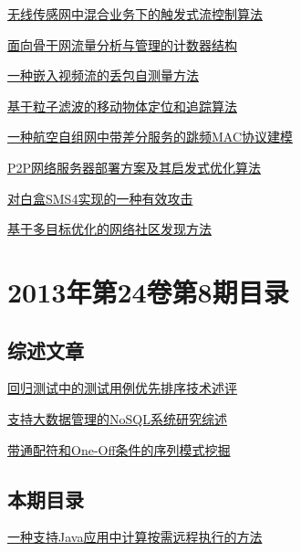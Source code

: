 \documentclass[a4paper]{article}
\begin{document}
\href{http://www.jos.org.cn/ch/reader/download_pdf.aspx?file_no=4351&year_id=2013&quarter_id=9&falg=1}{无线传感网中混合业务下的触发式流控制算法}

\href{http://www.jos.org.cn/ch/reader/download_pdf.aspx?file_no=4365&year_id=2013&quarter_id=9&falg=1}{面向骨干网流量分析与管理的计数器结构}

\href{http://www.jos.org.cn/ch/reader/download_pdf.aspx?file_no=4338&year_id=2013&quarter_id=9&falg=1}{一种嵌入视频流的丢包自测量方法}

\href{http://www.jos.org.cn/ch/reader/download_pdf.aspx?file_no=4367&year_id=2013&quarter_id=9&falg=1}{基于粒子滤波的移动物体定位和追踪算法}

\href{http://www.jos.org.cn/ch/reader/download_pdf.aspx?file_no=4335&year_id=2013&quarter_id=9&falg=1}{一种航空自组网中带差分服务的跳频MAC协议建模}

\href{http://www.jos.org.cn/ch/reader/download_pdf.aspx?file_no=4362&year_id=2013&quarter_id=9&falg=1}{P2P网络服务器部署方案及其启发式优化算法}

\href{http://www.jos.org.cn/ch/reader/download_pdf.aspx?file_no=4356&year_id=2013&quarter_id=9&falg=1}{对白盒SMS4实现的一种有效攻击}

\href{http://www.jos.org.cn/ch/reader/download_pdf.aspx?file_no=4400&year_id=2013&quarter_id=9&falg=1}{基于多目标优化的网络社区发现方法}


\section{\textbf{2013年第24卷第8期目录}}
\subsection{综述文章}
\href{http://www.jos.org.cn/ch/reader/download_pdf.aspx?file_no=4420&year_id=2013&quarter_id=8&falg=1}{回归测试中的测试用例优先排序技术述评}

\href{http://www.jos.org.cn/ch/reader/download_pdf.aspx?file_no=4416&year_id=2013&quarter_id=8&falg=1}{支持大数据管理的NoSQL系统研究综述}

\href{http://www.jos.org.cn/ch/reader/download_pdf.aspx?file_no=4422&year_id=2013&quarter_id=8&falg=1}{带通配符和One-Off条件的序列模式挖掘}

\subsection{本期目录}
\href{http://www.jos.org.cn/ch/reader/download_pdf.aspx?file_no=4344&year_id=2013&quarter_id=8&falg=1}{一种支持Java应用中计算按需远程执行的方法}
\end{document}
